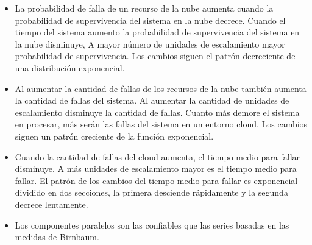 \begin{itemize}

\item La probabilidad de falla de un recurso de la nube aumenta cuando la probabilidad de supervivencia del sistema en la nube decrece.
Cuando el tiempo del sistema aumento la probabilidad de supervivencia del sistema en la nube disminuye,
A mayor número de unidades de escalamiento mayor probabilidad de supervivencia. Los cambios siguen el patrón decreciente de una  distribución exponencial.

\item Al aumentar la cantidad de fallas de los recursos de la nube también aumenta la cantidad de fallas del sistema. Al aumentar la cantidad de unidades de escalamiento disminuye la cantidad de fallas. 
Cuanto más demore el sistema en procesar, más serán las fallas del sistema en un entorno cloud.
Los cambios siguen un patrón creciente de la función exponencial.

\item Cuando la cantidad de fallas del cloud aumenta, el tiempo medio para fallar disminuye.
A más unidades de escalamiento mayor es el tiempo medio para fallar.
El patrón de los cambios del tiempo medio para fallar  es exponencial dividido en dos secciones, la primera desciende rápidamente y la segunda decrece lentamente.

\item  Los componentes paralelos son las confiables que las series basadas en las medidas de Birnbaum.

\end{itemize}
